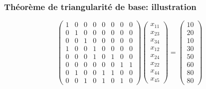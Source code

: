 \documentclass[usepdftitle=false]{beamer}
\begin{document}
\begin{frame}
\frametitle{Théorème de triangularité de base: illustration}

\[
\begin{pmatrix}
 1 & 0 & 0 & 0 & 0 & 0 & 0 & 0 \\
 0 & 1 & 0 & 0 & 0 & 0 & 0 & 0 \\
 0 & 0 & 1 & 0 & 0 & 0 & 0 & 0 \\
 1 & 0 & 0 & 1 & 0 & 0 & 0 & 0 \\
 0 & 0 & 0 & 1 & 0 & 1 & 0 & 0 \\
 0 & 0 & 0 & 0 & 0 & 0 & 1 & 1 \\
 0 & 1 & 0 & 0 & 1 & 1 & 0 & 0 \\
 0 & 0 & 1 & 0 & 1 & 0 & 1 & 0
\end{pmatrix}
\begin{pmatrix}
x_{11} \\
x_{23} \\
x_{34} \\
x_{12} \\
x_{24} \\
x_{22} \\
x_{44} \\
x_{45}
\end{pmatrix}
=
\begin{pmatrix}
10 \\
20 \\
10 \\
30 \\
50 \\
60 \\
80 \\
80
\end{pmatrix}
\]

\end{frame}
\end{document}

